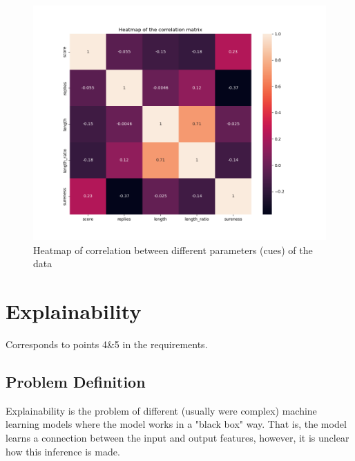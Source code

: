 \documentclass[11pt, oneside]{article}   	%
\begin{document}
\begin{figure}[H]\label{fig:correlation_heatmap}
    \begin{center}
    \includegraphics[width=\linewidth]{../plots/correlation_heatmap}
    \caption{Heatmap of correlation between different parameters (cues) of the data}
    \end{center}
\end{figure}


\section{Explainability}
Corresponds to points 4\&5 in the requirements.
\subsection{Problem Definition}
Explainability is the problem of different (usually were complex) machine learning models where the model works in a "black box" way. That is, the model learns a connection between the input and output features, however, it is unclear how this inference is made.\\
\end{document}
